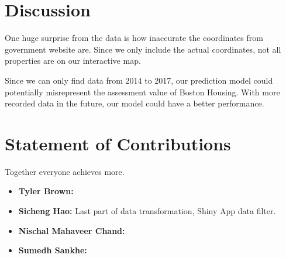 \documentclass[12pt]{article}
\begin{document}
\section*{Discussion}

One huge surprise from the data is how inaccurate the coordinates from government website are. Since we only include the actual coordinates, not all properties are on our interactive map. 

Since we can only find data from 2014 to 2017, our prediction model could potentially misrepresent the assessment value of Boston Housing. With more recorded data in the future, our model could have a better performance.

\section*{Statement of Contributions}

Together everyone achieves more.

\begin{itemize}
\item \textbf{Tyler Brown:}
\item \textbf{Sicheng Hao:} Last part of data transformation, Shiny App data filter.
\item \textbf{Nischal Mahaveer Chand:}
\item \textbf{Sumedh Sankhe:}
\end{itemize}
\end{document}
